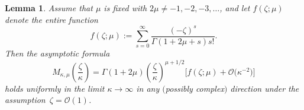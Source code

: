 \documentclass[pdftex]{sigma}
\numberwithin{equation}{section}
\newtheorem{Lemma}[Theorem]{Lemma}
\begin{document}
\begin{Lemma}\label{lem:M-expansion}
Assume that $\mu$ is fixed with $2\mu\neq -1,-2,-3,\dots$, and let $f(\zeta;\mu)$ denote the entire function
\begin{equation}
 f(\zeta;\mu):=\sum_{s=0}^\infty \frac{(-\zeta)^s}{\Gamma(1+2\mu+s)s!}.
\label{eq:Bessel-f-define}
\end{equation}
Then the asymptotic formula
\begin{equation*}%
 M_{\kappa,\mu}\left(\frac{\zeta}{\kappa}\right) = \Gamma(1+2\mu)\left(\frac{\zeta}{\kappa}\right)^{\mu+1/2}\big[f(\zeta;\mu) + \mathcal{O}\big(\kappa^{-2}\big)\big]
\end{equation*}
holds uniformly in the limit $\kappa\to\infty$ in any $($possibly complex$)$ direction under the assumption~${\zeta=\mathcal{O}(1)}$.
\end{Lemma}
\end{document}
